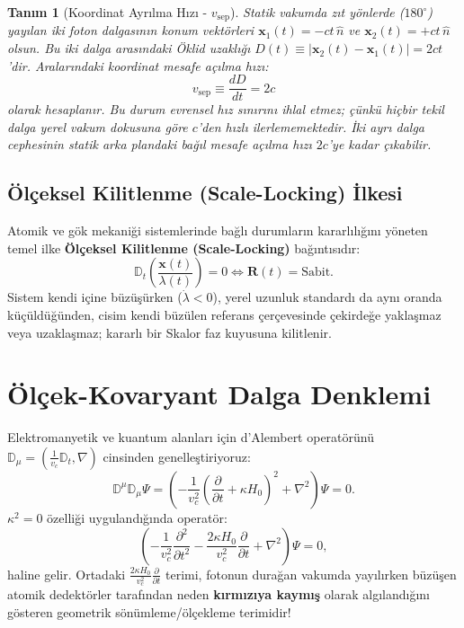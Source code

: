 \documentclass[11pt,a4paper]{article}
\newtheorem{definition}{Tanım}[section]
\begin{document}
\begin{definition}[Koordinat Ayrılma Hızı - $v_{\mathrm{sep}}$]
    \label{def:koordinat_ayrilma_hizi_sc}
    Statik vakumda zıt yönlerde ($180^\circ$) yayılan iki foton dalgasının konum vektörleri $\mathbf{x}_1(t) = -c t \, \hat{n}$ ve $\mathbf{x}_2(t) = +c t \, \hat{n}$ olsun. Bu iki dalga arasındaki Öklid uzaklığı $D(t) \equiv |\mathbf{x}_2(t) - \mathbf{x}_1(t)| = 2ct$'dir. Aralarındaki koordinat mesafe açılma hızı:
    \begin{equation}
        v_{\mathrm{sep}} \equiv \frac{d D}{dt} = 2c
        \label{eq:ayrilma_hizi_2c}
    \end{equation}
    olarak hesaplanır. Bu durum evrensel hız sınırını ihlal etmez; çünkü hiçbir tekil dalga yerel vakum dokusuna göre $c$'den hızlı ilerlememektedir. İki ayrı dalga cephesinin statik arka plandaki bağıl mesafe açılma hızı $2c$'ye kadar çıkabilir.
\end{definition}

\subsection{Ölçeksel Kilitlenme (Scale-Locking) İlkesi}
\label{sec:olceksel_kilitlenme}

Atomik ve gök mekaniği sistemlerinde bağlı durumların kararlılığını yöneten temel ilke \textbf{Ölçeksel Kilitlenme (Scale-Locking)} bağıntısıdır:
\begin{equation}
    \mathbb{D}_t \left( \frac{\mathbf{x}(t)}{\lambda(t)} \right) = 0 \iff \mathbf{R}(t) = \text{Sabit}.
    \label{eq:scale_locking_tanim}
\end{equation}
Sistem kendi içine büzüşürken ($\dot{\lambda} < 0$), yerel uzunluk standardı da aynı oranda küçüldüğünden, cisim kendi büzülen referans çerçevesinde çekirdeğe yaklaşmaz veya uzaklaşmaz; kararlı bir Skalor faz kuyusuna kilitlenir.

\section{Ölçek-Kovaryant Dalga Denklemi}
\label{sec:dalga_denklemi}

Elektromanyetik ve kuantum alanları için d'Alembert operatörünü $\mathbb{D}_\mu = (\frac{1}{v_c}\mathbb{D}_t, \nabla)$ cinsinden genelleştiriyoruz:
\begin{equation}
    \mathbb{D}^\mu \mathbb{D}_\mu \Psi = \left( -\frac{1}{v_c^2} \left(\frac{\partial}{\partial t} + \kappa H_0\right)^2 + \nabla^2 \right) \Psi = 0.
    \label{eq:genel_dalga_operatoru}
\end{equation}
$\kappa^2 = 0$ özelliği uygulandığında operatör:
\begin{equation}
    \left( -\frac{1}{v_c^2} \frac{\partial^2}{\partial t^2} - \frac{2\kappa H_0}{v_c^2} \frac{\partial}{\partial t} + \nabla^2 \right) \Psi = 0,
    \label{eq:acik_dalga}
\end{equation}
haline gelir. Ortadaki $\frac{2\kappa H_0}{v_c^2} \frac{\partial}{\partial t}$ terimi, fotonun durağan vakumda yayılırken büzüşen atomik dedektörler tarafından neden \textbf{kırmızıya kaymış} olarak algılandığını gösteren geometrik sönümleme/ölçekleme terimidir!
\end{document}
